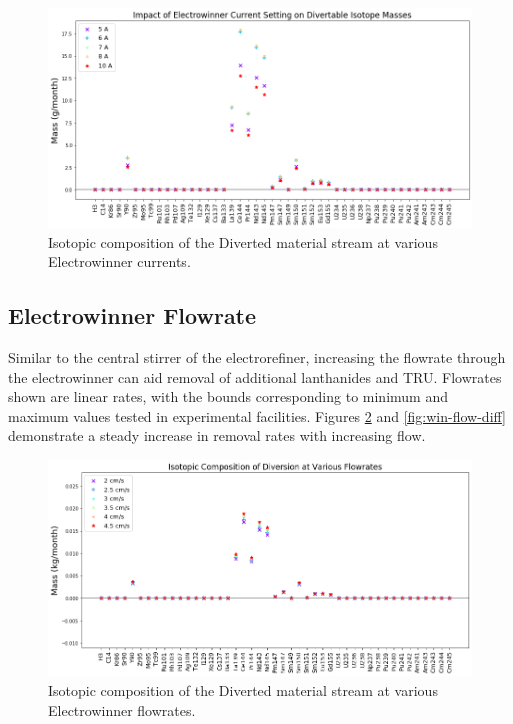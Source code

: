 \begin{figure}
	\includegraphics[width=\linewidth]{images/current-sa-diff}
	\caption{Isotopic composition of the Diverted material stream at various Electrowinner currents.}
	\label{fig:win-cur-diff}
\end{figure}

\subsection{Electrowinner Flowrate}

Similar to the central stirrer of the electrorefiner, increasing the flowrate through the electrowinner can aid removal of additional lanthanides and TRU. Flowrates shown are linear rates, with the bounds corresponding to minimum and maximum values tested in experimental facilities. Figures \ref{fig:win-flow-sa} and \ref{fig:win-flow-diff} demonstrate a steady increase in removal rates with increasing flow.

\begin{figure}
	\includegraphics[width=\linewidth]{images/flowrate-sa-comp}
	\caption{Isotopic composition of the Diverted material stream at various Electrowinner flowrates.}
	\label{fig:win-flow-sa}
\end{figure}

